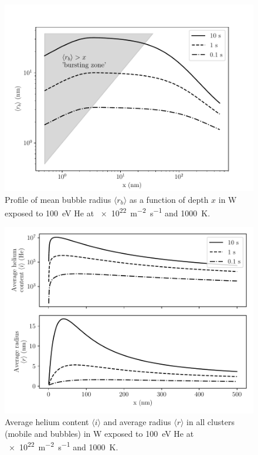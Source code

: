 \begin{figure} [h]
    \centering
    \includegraphics[width=\linewidth]{Figures/Chapter4/half_slab/profile_rb.pdf}
    \caption{Profile of mean bubble radius $\langle r_b \rangle$ as a function of depth $x$ in \gls{W} exposed to \SI{100}{eV} \gls{He} at \SI{e22}{m^{-2}.s^{-1}} and \SI{1000}{K}.}
\end{figure}

\begin{figure}
    \centering
    \includegraphics[width=0.75\linewidth]{Figures/Chapter4/half_slab/average_content_radius.pdf}
    \caption{Average helium content $\langle i \rangle$ and average radius $\langle r \rangle$ in all clusters (mobile and bubbles) in \gls{W} exposed to \SI{100}{eV} \gls{He} at \SI{e22}{m^{-2}.s^{-1}} and \SI{1000}{K}.}
\end{figure}

